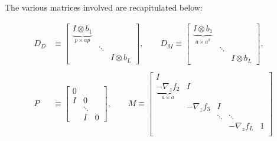 \documentclass{article}
\begin{document}
The various matrices involved are recapitulated below:

\begin{align*}
    D_D    & \equiv \begin{bmatrix}
                        \underbrace{I \otimes b_1}_{p \times ap} &        &               \\
                                                                 & \ddots &               \\
                                                                 &        & I \otimes b_L
                    \end{bmatrix}
    ,
    \qquad
    D_M \equiv \begin{bmatrix}
                   \underbrace{I \otimes b_1}_{a \times a^2} &        &               \\
                                                             & \ddots &               \\
                                                             &        & I \otimes b_L
               \end{bmatrix}
    ,                                                                                                \\                                                                                     \\
    P      & \equiv \begin{bmatrix}
                        0 \\ I & 0 \\ &\ddots \\ &I&0
                    \end{bmatrix}
    ,    \qquad
    M       \equiv \begin{bmatrix}
                       I                                                                                    \\
                       \underbrace{-\nabla_z f_2}_{a \times a} & I                                          \\
                                                               & -\nabla_z f_3 & I                          \\
                                                               &               & \ddots & \ddots            \\
                                                               &               &        & -\nabla_z f_L & 1 \\
                   \end{bmatrix}

\end{align*}
\end{document}
